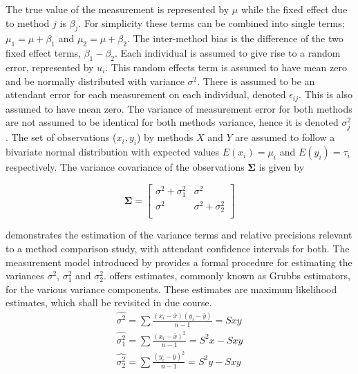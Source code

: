 \documentclass[12pt, a4paper]{report}
\theoremstyle{plain}
\theoremstyle{definition}
\theoremstyle{remark}
\begin{document}
	The true value of the measurement is represented by $\mu$ while the fixed effect due to method $j$ is $\beta_{j}$.
	For simplicity these terms can be combined into single terms; $\mu_{1} = \mu+ \beta_{1}$ and $\mu_{2} = \mu + \beta_{2}$. The inter-method bias is the difference of the two fixed effect terms, $\beta_{1}-\beta_{2}$. Each individual is assumed to give rise to a random error, represented by $u_{i}$. This random effects term is assumed to have mean zero and be normally distributed with variance $\sigma^2$. There is assumed to be an attendant error for each measurement on each individual, denoted $\epsilon_{ij}$. This is also assumed to have mean zero. The variance of measurement error for both methods are not assumed to be identical for both methods variance,  hence it is denoted $\sigma^2_{j}$. The set of observations ($x_{i},y_{i}$) by methods $X$ and $Y$ are assumed to follow a bivariate normal distribution with expected values $E(x_{i})= \mu_{i}$ and $E(y_{i})= \tau_{i}$ respectively. The variance covariance of the observations $\boldsymbol{\Sigma}$ is given by
	
	\[
	\boldsymbol{\Sigma} = \left[
	\begin{array}{cc}
	\sigma^{2} + \sigma^{2}_{1} & \sigma^{2} \\
	\sigma^{2} & \sigma^{2} + \sigma^{2}_{2} \\
	\end{array}
	\right]
	\] 
	
	\citet{Kinsella} demonstrates the estimation of the variance terms and relative precisions relevant to a method comparison study, with attendant confidence intervals for both. The measurement model introduced by \citet{Grubbs48,Grubbs73} provides a formal procedure for estimating the variances $\sigma^2$, $\sigma^2_{1}$ and $\sigma^2_{2}$. \citet{Grubbs48} offers estimates, commonly known as Grubbs estimators, for the various variance components. These estimates are maximum likelihood estimates, which shall be revisited in due course.
	\begin{eqnarray*}
		\hat{\sigma^{2}} = \sum{\frac{(x_{i}-\bar{x})(y_{i}-\bar{y})}{n-1}} = Sxy\\
		\hat{\sigma^{2}_{1}} = \sum{\frac{(x_{i}-\bar{x})^{2}}{n-1}} =S^{2}x - Sxy  \\
		\hat{\sigma^{2}_{2}} =
		\sum{\frac{(y_{i}-\bar{y})^{2}}{n-1}} = S^{2}y - Sxy
	\end{eqnarray*}
	
\end{document}
